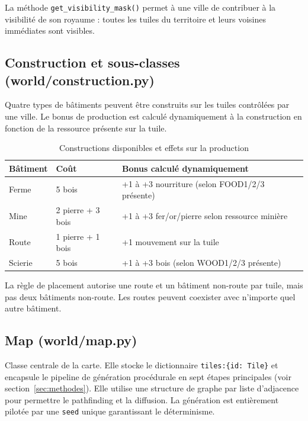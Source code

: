 \documentclass[12pt, a4paper]{article}
\begin{document}
La méthode \texttt{get\_visibility\_mask()} permet à une ville de contribuer à la visibilité
de son royaume : toutes les tuiles du territoire et leurs voisines immédiates sont visibles.

\subsection{Construction et sous-classes (world/construction.py)}

Quatre types de bâtiments peuvent être construits sur les tuiles contrôlées par une ville.
Le bonus de production est calculé dynamiquement à la construction en fonction de la ressource
présente sur la tuile.

\begin{table}[H]
\centering
\begin{tabular}{llll}
\toprule
\textbf{Bâtiment} & \textbf{Coût} & \textbf{Bonus calculé dynamiquement} \\
\midrule
Ferme     & 5 bois            & +1 à +3 nourriture (selon FOOD1/2/3 présente) \\
Mine      & 2 pierre + 3 bois & +1 à +3 fer/or/pierre selon ressource minière \\
Route     & 1 pierre + 1 bois & +1 mouvement sur la tuile \\
Scierie   & 5 bois            & +1 à +3 bois (selon WOOD1/2/3 présente) \\
\bottomrule
\end{tabular}
\caption{Constructions disponibles et effets sur la production}
\label{tab:constructions_inline}
\end{table}

La règle de placement autorise une route et un bâtiment non-route par tuile, mais pas deux
bâtiments non-route. Les routes peuvent coexister avec n'importe quel autre bâtiment.

\subsection{Map (world/map.py)}

Classe centrale de la carte. Elle stocke le dictionnaire \texttt{tiles:\{id: Tile\}} et
encapsule le pipeline de génération procédurale en sept étapes principales
(voir section~\ref{sec:methodes}). Elle utilise une structure de graphe par liste d'adjacence pour
permettre le pathfinding et la diffusion. La génération est entièrement pilotée par une
\texttt{seed} unique garantissant le déterminisme.
\end{document}
